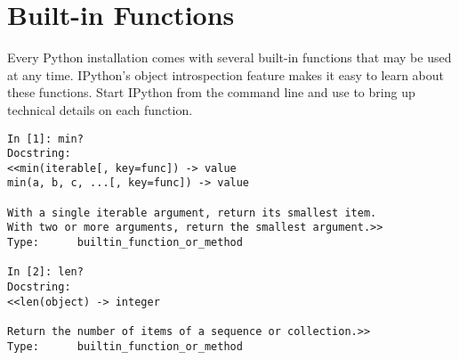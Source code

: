 \label{lab:Standard Library}


\section*{Built-in Functions} %

Every Python installation comes with several built-in functions that may be used at any time.
IPython's object introspection feature makes it easy to learn about these functions.
Start IPython from the command line and use  to bring up technical details on each function.

\begin{lstlisting}
In [1]: min?
Docstring:
<<min(iterable[, key=func]) -> value
min(a, b, c, ...[, key=func]) -> value

With a single iterable argument, return its smallest item.
With two or more arguments, return the smallest argument.>>
Type:      builtin_function_or_method

In [2]: len?
Docstring:
<<len(object) -> integer

Return the number of items of a sequence or collection.>>
Type:      builtin_function_or_method
\end{lstlisting}

